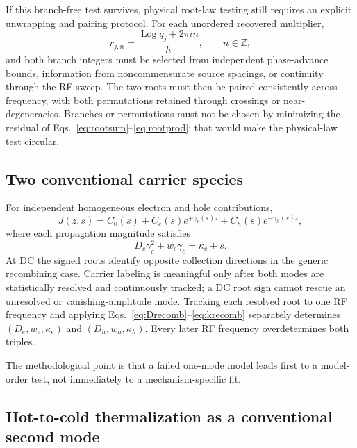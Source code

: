 \documentclass[11pt]{article}
\begin{document}
If this branch-free test survives, physical root-law testing still requires an explicit unwrapping and pairing protocol. For each unordered recovered multiplier,
\begin{equation}
r_{j,n}=\frac{\operatorname{Log}q_j+2\pi i n}{h},\qquad n\in\mathbb Z,
\end{equation}
and both branch integers must be selected from independent phase-advance bounds, information from noncommensurate source spacings, or continuity through the RF sweep. The two roots must then be paired consistently across frequency, with both permutations retained through crossings or near-degeneracies. Branches or permutations must not be chosen by minimizing the residual of Eqs.~\eqref{eq:rootsum}--\eqref{eq:rootprod}; that would make the physical-law test circular.

\subsection{Two conventional carrier species}

For independent homogeneous electron and hole contributions,
\begin{equation}
J(z,s)=C_0(s)+C_e(s)e^{+\gamma_e(s)z}+C_h(s)e^{-\gamma_h(s)z},
\end{equation}
where each propagation magnitude satisfies
\begin{equation}
D_c\gamma_c^2+w_c\gamma_c=\kappa_c+s.
\end{equation}
At DC the signed roots identify opposite collection directions in the generic recombining case. Carrier labeling is meaningful only after both modes are statistically resolved and continuously tracked; a DC root sign cannot rescue an unresolved or vanishing-amplitude mode. Tracking each resolved root to one RF frequency and applying Eqs.~\eqref{eq:Drecomb}--\eqref{eq:krecomb} separately determines $(D_e,w_e,\kappa_e)$ and $(D_h,w_h,\kappa_h)$. Every later RF frequency overdetermines both triples.

The methodological point is that a failed one-mode model leads first to a model-order test, not immediately to a mechanism-specific fit.

\subsection{Hot-to-cold thermalization as a conventional second mode}
\end{document}
